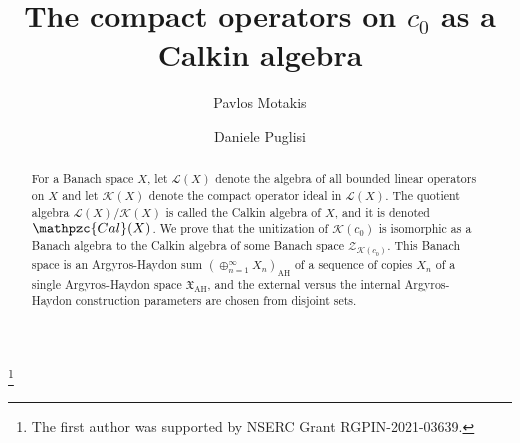\documentclass[11pt]{amsart}
\theoremstyle{definition}
\numberwithin{equation}{section}
\begin{document}
\title[The compact operators on $c_0$ as a Calkin algebra]{The compact operators on $c_0$ as a Calkin algebra}




\author[P. Motakis]{Pavlos Motakis}

\address{Department of Mathematics and Statistics, York University, 4700 Keele Street, Toronto, Ontario, M3J 1P3, Canada}


\author[D. Puglisi]{Daniele Puglisi}

\address{Department of Mathematics and Computer Sciences, University of Catania, Catania, 95125, Italy}





\thanks{The first author was supported by NSERC Grant RGPIN-2021-03639.}


\keywords{}








\begin{abstract}
For a Banach space $X$, let $\mathcal{L}(X)$ denote the algebra of all bounded linear operators on $X$ and let $\mathcal{K}(X)$ denote the compact operator ideal in $\mathcal{L}(X)$. The quotient algebra $\mathcal{L}(X)/\mathcal{K}(X)$ is called the Calkin algebra of $X$, and it is denoted $\mathpzc{Cal}(X)$. We prove that the unitization of $\mathcal{K}(c_0)$ is isomorphic as a Banach algebra to the Calkin algebra of some Banach space $\mathcal{Z}_{\mathcal{K}(c_0)}$. This Banach space is an Argyros-Haydon sum $(\oplus_{n=1}^\infty X_n)_\mathrm{AH}$ of a sequence of copies $X_n$ of a single Argyros-Haydon space $\mathfrak{X}_\mathrm{AH}$, and the external versus the internal Argyros-Haydon construction parameters are chosen from disjoint sets.
\end{abstract}






\maketitle

\end{document}
